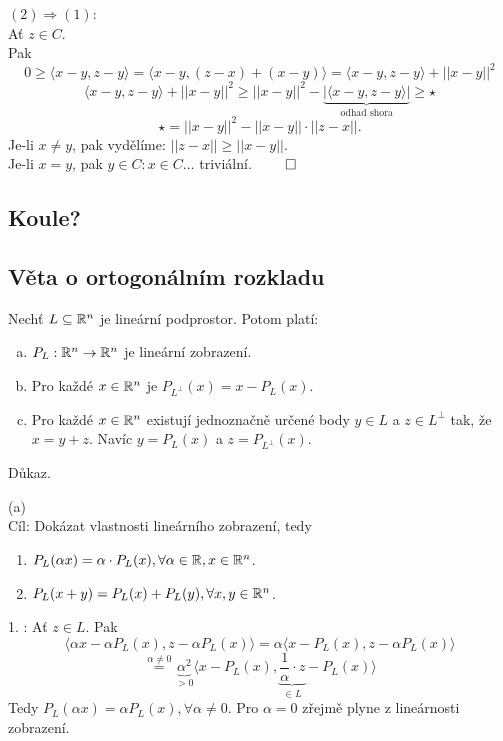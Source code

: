$(2) \Rightarrow (1)$:\\
Ať $z \in C$.\\
Pak
\[
    0 \geq \langle x-y, z-y \rangle = \langle x-y, (z-x)+(x-y) \rangle = \langle x-y, z-y \rangle + ||x-y||^2  
\]
\[
    \langle x-y, z-y \rangle + ||x-y||^2 \geq  ||x-y||^2 - \underbrace{|\langle x-y, z-y\rangle|}_{\text{odhad shora}} \geq \star
\]
\[
    \star = ||x-y||^2 - ||x-y|| \cdot ||z-x||.
\]
Je-li $x \not= y$, pak vydělíme: $||z-x|| \geq ||x-y||$.\\
Je-li $x=y$, pak $y \in C : x \in C \dots$ triviální. $\qed$ 

\subsection{Koule?} %


\subsection{Věta o ortogonálním rozkladu} \label{ortoRoz}

Nechť $L \subseteq \mathbb{R}^n$ je lineární podprostor. Potom platí:

\begin{enumerate}[(a)]
    \item $P_L : \mathbb{R}^n \rightarrow \mathbb{R}^n$ je lineární zobrazení.
    \item Pro každé $x \in \mathbb{R}^n$ je $P_{L^\perp} (x) = x - P_L (x)$.
    \item Pro každé $x \in \mathbb{R}^n$ existují jednoznačně určené body $y \in L$ a $z \in L^\perp$ tak, že $x=y + z$. Navíc 
    $y = P_L(x)$ a $z=P_{L^ \perp} (x)$.
\end{enumerate}

Důkaz.

(a)\\
Cíl: Dokázat vlastnosti lineárního zobrazení, tedy 
\begin{enumerate}
    \item $P_L (\alpha x) = \alpha \cdot P_L (x), \forall \alpha \in \mathbb{R}, x \in \mathbb{R}^n$.
    \item $P_L (x + y) =   P_L (x) +  P_L (y), \forall x,y \in \mathbb{R}^n$.
\end{enumerate}

1. : Ať $z \in L$.
Pak 
\[
    \langle \alpha x - \alpha P_L (x), z - \alpha P_L (x) \rangle = \alpha  \langle x - P_L (x), z - \alpha P_L (x)\rangle
\]
\[
    \stackrel{\alpha \not= 0}{=} \underbrace{\alpha^2}_{> 0} \langle x - P_L (x), \underbrace{\frac{1}{\alpha} 
    \cdot z}_{\in L} - P_L (x)\rangle
\]
Tedy $P_L(\alpha x) = \alpha P_L(x), \forall \alpha \not= 0$. Pro $\alpha =0$ zřejmě plyne z lineárnosti zobrazení.

